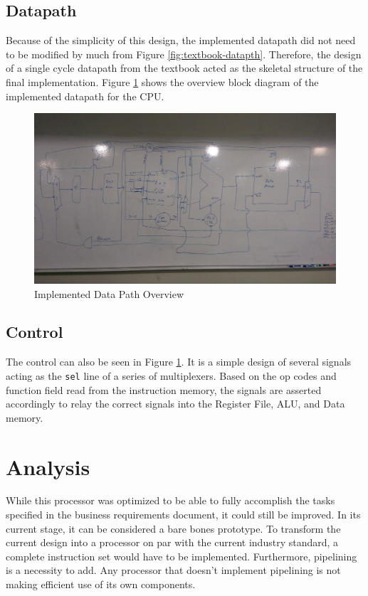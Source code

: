 \documentclass[12pt]{article}
\begin{document}
\subsection{Datapath}
Because of the simplicity of this design, the implemented datapath did not need to be modified by much from Figure \ref{fig:textbook-datapth}. Therefore, the design of a single cycle datapath from the textbook acted as the skeletal structure of the final implementation.
Figure \ref{fig:datapth} shows the overview block diagram of the implemented datapath for the CPU.
\begin{figure}[H]
\centering
\includegraphics[width=\linewidth]{datapth}
\caption{Implemented Data Path Overview}
\label{fig:datapth}
\end{figure}

\subsection{Control}
The control can also be seen in Figure \ref{fig:datapth}. It is a simple design of several signals acting as the \texttt{sel} line of a series of multiplexers. Based on the op codes and function field read from the instruction memory, the signals are asserted accordingly to relay the correct signals into the Register File, ALU, and Data memory.
\section{Analysis}
While this processor was optimized to be able to fully accomplish the tasks specified in the business requirements document, it could still be improved. In its current stage, it can be considered a bare bones prototype. To transform the current design into a processor on par with the current industry standard, a complete instruction set would have to be implemented. Furthermore, pipelining is a necessity to add. Any processor that doesn't implement pipelining is not making efficient use of its own components.   
\end{document}
